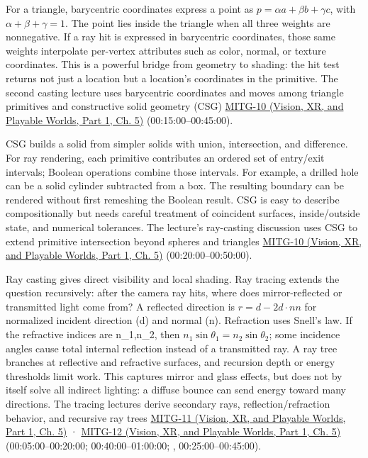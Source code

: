 For a triangle, barycentric coordinates express a point as \(p=\alpha a+\beta b+\gamma c\), with \(\alpha+\beta+\gamma=1\). The point lies inside the triangle when all three weights are nonnegative. If a ray hit is expressed in barycentric coordinates, those same weights interpolate per-vertex attributes such as color, normal, or texture coordinates. This is a powerful bridge from geometry to shading: the hit test returns not just a location but a location's coordinates in the primitive. The second casting lecture uses barycentric coordinates and moves among triangle primitives and constructive solid geometry (CSG) \href{../07-Vision-XR-and-Playable-Worlds-P01/main.pdf\#nameddest=04-visual-computing-ii-ch036-mitg-10---ray-casting-ii}{MITG-10 (Vision, XR, and Playable Worlds, Part 1, Ch. 5)} (00:15:00--00:45:00).

CSG builds a solid from simpler solids with union, intersection, and difference. For ray rendering, each primitive contributes an ordered set of entry/exit intervals; Boolean operations combine those intervals. For example, a drilled hole can be a solid cylinder subtracted from a box. The resulting boundary can be rendered without first remeshing the Boolean result. CSG is easy to describe compositionally but needs careful treatment of coincident surfaces, inside/outside state, and numerical tolerances. The lecture's ray-casting discussion uses CSG to extend primitive intersection beyond spheres and triangles \href{../07-Vision-XR-and-Playable-Worlds-P01/main.pdf\#nameddest=04-visual-computing-ii-ch036-mitg-10---ray-casting-ii}{MITG-10 (Vision, XR, and Playable Worlds, Part 1, Ch. 5)} (00:20:00--00:50:00).

Ray casting gives direct visibility and local shading. Ray tracing extends the question recursively: after the camera ray hits, where does mirror-reflected or transmitted light come from? A reflected direction is \(r=d-2d\cdot nn\) for normalized incident direction (d) and normal (n). Refraction uses Snell's law. If the refractive indices are n\_1,n\_2, then \(n_1\sin\theta_1=n_2\sin\theta_2\); some incidence angles cause total internal reflection instead of a transmitted ray. A ray tree branches at reflective and refractive surfaces, and recursion depth or energy thresholds limit work. This captures mirror and glass effects, but does not by itself solve all indirect lighting: a diffuse bounce can send energy toward many directions. The tracing lectures derive secondary rays, reflection/refraction behavior, and recursive ray trees \href{../07-Vision-XR-and-Playable-Worlds-P01/main.pdf\#nameddest=04-visual-computing-ii-ch036-mitg-11---ray-tracing}{MITG-11 (Vision, XR, and Playable Worlds, Part 1, Ch. 5)} · \href{../07-Vision-XR-and-Playable-Worlds-P01/main.pdf\#nameddest=04-visual-computing-ii-ch036-mitg-12---ray-tracing-ii}{MITG-12 (Vision, XR, and Playable Worlds, Part 1, Ch. 5)} (00:05:00--00:20:00; 00:40:00--01:00:00; , 00:25:00--00:45:00).

